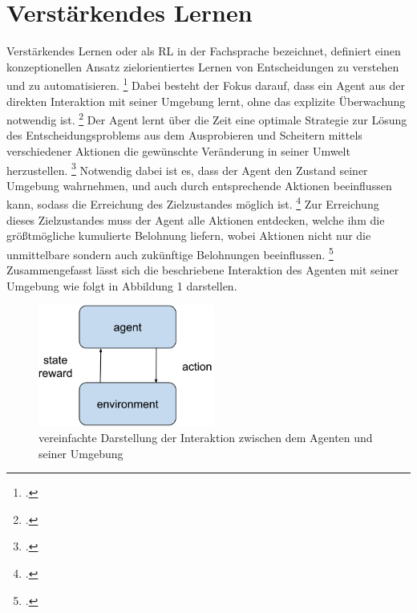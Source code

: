 \section{Verstärkendes Lernen}
Verstärkendes Lernen oder als RL in der Fachsprache bezeichnet, definiert einen konzeptionellen Ansatz zielorientiertes Lernen von Entscheidungen zu verstehen und zu automatisieren. \footcite[Vgl.][S. 13]{Sutton.2018}
Dabei besteht der Fokus darauf, dass ein Agent aus der direkten Interaktion mit seiner Umgebung lernt, ohne das explizite Überwachung notwendig ist. \footcite[Vgl.][S. 13]{Sutton.2018}
Der Agent lernt über die Zeit eine optimale Strategie zur Lösung des Entscheidungsproblems aus dem Ausprobieren und Scheitern mittels verschiedener Aktionen die gewünschte Veränderung in seiner Umwelt herzustellen. \footcite[Vgl.][S. 4]{Li.2019}
Notwendig dabei ist es, dass der Agent den Zustand seiner Umgebung wahrnehmen, und auch durch entsprechende Aktionen beeinflussen kann, sodass die Erreichung des Zielzustandes möglich ist. \footcite[Vgl.][S. 2]{Sutton.2018}
Zur Erreichung dieses Zielzustandes muss der Agent alle Aktionen entdecken, welche ihm die größtmögliche kumulierte Belohnung liefern, wobei Aktionen nicht nur die unmittelbare sondern auch zukünftige Belohnungen beeinflussen. \footcite[Vgl.][S. 1]{Sutton.2018}
Zusammengefasst lässt sich die beschriebene Interaktion des Agenten mit seiner Umgebung wie folgt in Abbildung 1 darstellen.
\begin{figure}[htb]
    \centering
    \includegraphics[height=4cm]{lib/graphics/Agent-Environment interaction.png}
    \caption[vereinfachte Darstellung der Interaktion zwischen dem Agenten und seiner Umgebung]{vereinfachte Darstellung der Interaktion zwischen dem Agenten und seiner Umgebung\footnotemark}
    \label{abb:Agent-Environment interaction}
\end{figure}

